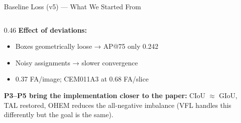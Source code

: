 \documentclass[aspectratio=169, 10pt]{beamer}
\begin{document}
\begin{frame}{Baseline Loss (v5) — What We Started From}
\begin{columns}[T]
\begin{column}{0.46\textwidth}
      \vspace{4pt}
      \textbf{Effect of deviations:}
      \begin{itemize}\scriptsize
        \item Boxes geometrically loose → AP@75 only 0.242
        \item Noisy assignments → slower convergence
        \item 0.37 FA/image; CEM011A3 at 0.68 FA/slice
      \end{itemize}

      \vspace{3pt}
      {\scriptsize \textbf{P3–P5 bring the implementation closer to the paper:}
      CIoU $\approx$ GIoU, TAL restored, OHEM reduces the all-negative imbalance
      (VFL handles this differently but the goal is the same).}
    \end{column}
  \end{columns}
\end{frame}
\end{document}
